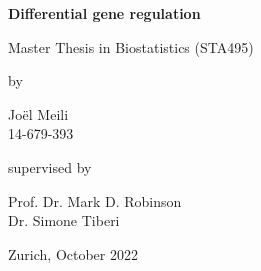 \renewcommand\familydefault{\sfdefault} 


\thispagestyle{empty}
\renewcommand{\baselinestretch}{1.5}\normalfont
\begin{center}
\setlength{\parindent}{0cm}
\bf\Large%
Differential gene regulation \\

\normalfont



\hrulefill

\vspace*{4cm}

\large
Master Thesis in Biostatistics (STA495) %
\vspace*{12mm}

by

\vspace*{12mm}

Jo\"el Meili \\
\small 14-679-393 \\
\normalfont
\vspace*{4cm}

supervised by

\vspace*{1cm}

Prof. Dr. Mark D. Robinson \\
Dr. Simone Tiberi

\vfill

Zurich, October 2022
\end{center}
\renewcommand\familydefault{\rmdefault}%
\renewcommand{\baselinestretch}{1.0}\rm 
\setcounter{page}{0}
\newpage
\vspace*{12cm}~\thispagestyle{empty}
\newpage